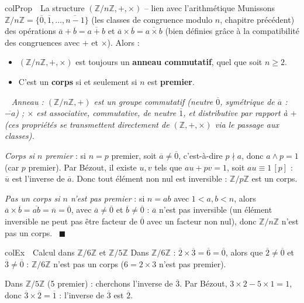 \documentclass[11pt,a4paper]{article}
\newenvironment{propriete}[1][Propriété]
  {\begin{fiche}{colProp}{\ding{72}~~#1}}{\end{fiche}}
\newenvironment{exemple}[1][Exemple]
  {\begin{fiche}{colEx}{\ding{217}~~#1}}{\end{fiche}}
\newenvironment{demo}
  {\par\smallskip\noindent{\sffamily\bfseries\color{qtealdark}Démonstration.}\ \itshape}
  {\ \normalfont\hfill$\blacksquare$\par\medskip}
\begin{document}
\begin{propriete}[La structure $(\mathbb{Z}/n\mathbb{Z},+,\times)$ -- lien avec l'arithmétique]
Munissons $\mathbb{Z}/n\mathbb{Z}=\{\overline0,\overline1,\ldots,\overline{n-1}\}$ (les classes de congruence modulo $n$, chapitre précédent) des opérations $\overline a+\overline b=\overline{a+b}$ et $\overline a\times\overline b=\overline{a\times b}$ (bien définies grâce à la compatibilité des congruences avec $+$ et $\times$). Alors :
\begin{itemize}[leftmargin=6mm, itemsep=0.5mm]
  \item $(\mathbb{Z}/n\mathbb{Z},+,\times)$ est toujours un \textbf{anneau commutatif}, quel que soit $n\geq2$.
  \item C'est un \textbf{corps} si et seulement si $n$ est \textbf{premier}.
\end{itemize}
\end{propriete}

\begin{demo}
\emph{Anneau} : $(\mathbb{Z}/n\mathbb{Z},+)$ est un groupe commutatif (neutre $\overline0$, symétrique de $\overline a$ : $\overline{-a}$) ; $\times$ est associative, commutative, de neutre $\overline1$, et distributive par rapport à $+$ (ces propriétés se transmettent directement de $(\mathbb{Z},+,\times)$ via le passage aux classes).

\smallskip
\emph{Corps si $n$ premier} : si $n=p$ premier, soit $\overline a\ne\overline0$, c'est-à-dire $p\nmid a$, donc $a\wedge p=1$ (car $p$ premier). Par Bézout, il existe $u,v$ tels que $au+pv=1$, soit $au\equiv1\,[p]$ : $\overline u$ est l'inverse de $\overline a$. Donc tout élément non nul est inversible : $\mathbb{Z}/p\mathbb{Z}$ est un corps.

\smallskip
\emph{Pas un corps si $n$ n'est pas premier} : si $n=ab$ avec $1<a,b<n$, alors $\overline a\times\overline b=\overline{ab}=\overline n=\overline0$, avec $\overline a\ne\overline0$ et $\overline b\ne\overline0$ : $\overline a$ n'est pas inversible (un élément inversible ne peut pas être facteur de $\overline0$ avec un facteur non nul), donc $\mathbb{Z}/n\mathbb{Z}$ n'est pas un corps.
\end{demo}

\begin{exemple}[Calcul dans $\mathbb{Z}/6\mathbb{Z}$ et $\mathbb{Z}/5\mathbb{Z}$]
Dans $\mathbb{Z}/6\mathbb{Z}$ : $\overline2\times\overline3=\overline6=\overline0$, alors que $\overline2\ne\overline0$ et $\overline3\ne\overline0$ : $\mathbb{Z}/6\mathbb{Z}$ n'est pas un corps ($6=2\times3$ n'est pas premier).

\smallskip
Dans $\mathbb{Z}/5\mathbb{Z}$ (5 premier) : cherchons l'inverse de $\overline3$. Par Bézout, $3\times2-5\times1=1$, donc $\overline3\times\overline2=\overline1$ : l'inverse de $\overline3$ est $\overline2$.
\end{exemple}
\end{document}
